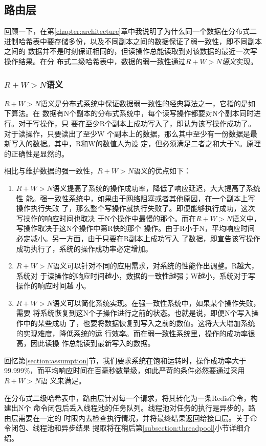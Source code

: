 \subsection{路由层}
回顾一下，在第\ref{chapter:architecture}章中我说明了为什么同一个数据在分布式二
进制哈希表中要存储多份，以及不同副本之间的数据保证了弱一致性，即不同副本之间的
数据并不是时刻保证相同的，但读操作总能读取到对该数据的最近一次写操作结果。在分
布式二级哈希表中，数据的弱一致性通过\emph{$R+W>N$语义}实现。

\subsubsection{$R+W>N$语义}
$R+W>N$语义是分布式系统中保证数据弱一致性的经典算法之一，它指的是如下算法。在
数据有N个副本的分布式系统中，每个读写操作都要对N个副本同时进行。对于写操作，只
要在至少R个副本上成功写入了，即认为该写操作成功了。对于读操作，只要读出了至少W
个副本上的数据，那么其中至少有一份数据是最新写入的数据。其中，R和W的数值人为设
定，但必须满足二者之和大于N。原理的正确性是显然的。

相比与维护数据的强一致性，$R+W>N$语义的优点如下：
\begin{enumerate}
  \item $R+W>N$语义提高了系统的操作成功率，降低了响应延迟，大大提高了系统性
  能。强一致性系统中，如果由于网络阻塞或者其他原因，在一个副本上写操作执行失败
  了，那么整个写操作就执行失败了。即便能够执行成功，这次写操作的响应时间也取决
  于N个操作中最慢的那个。而在$R+W>N$语义中，写操作取决于这N个操作中第R快的那个
  操作。由于R小于N，平均响应时间必定减小。另一方面，由于只要在R副本上成功写入
  了数据，即宣告该写操作成功执行了，系统的操作成功率必定增加。
  \item $R+W>N$语义可以针对不同的应用需求，对系统的性能作出调整。R越大，系统对
  于读操作的响应时间越小，数据的一致性越强；W越小，系统对于写操作的响应时间越
  小。
  \item $R+W>N$语义可以简化系统实现。在强一致性系统中，如果某个操作失败，需要
  将系统恢复到这N个子操作进行之前的状态。也就是说，即便N个写入操作中的某些成功
  了，也要将数据恢复到写入之前的数值。这将大大增加系统的实现难度，降低系统的运
  行效率。\cite{fox1997cluster}而在弱一致性系统里，操作的成功率很高，因此读操
  作总能读到最新写入的数据。
\end{enumerate}
回忆第\ref{section:assumption}节，我们要求系统在饱和运转时，操作成功率大于
99.999\%，而平均响应时间在百毫秒数量级，如此严苛的条件必然要通过采用$R+W>N$语
义来满足。

在分布式二级哈希表中，路由层针对每一个请求，将其转化为一条Redis命令，构建出N个
命令闭包后丢入线程池的任务队列。线程池对任务的执行是异步的，路由层需要在一定的
时限内去检查执行情况，并将最终结果返回给接口层。关于命令闭包、线程池和异步结果
提取将在稍后第\ref{subsection:threadpool}小节详细介绍。

